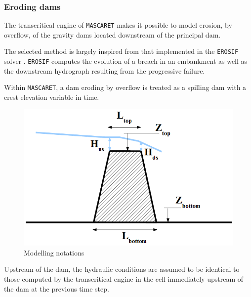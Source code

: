 \subsubsection{Eroding dams}

The transcritical engine of \texttt{MASCARET} makes it possible to model erosion, by overflow, of the gravity dams located downstream of the principal dam.

\vspace{0.5cm}

The selected method is largely inspired from that implemented in the \texttt{EROSIF} solver \cite{BENSLAMA95}. \texttt{EROSIF} computes the evolution of a breach in an embankment as well as the downstream hydrograph resulting from the progressive failure.

\vspace{0.5cm}

Within \texttt{MASCARET}, a dam eroding by overflow is treated as a spilling dam with a crest elevation variable in time.

\vspace{0.5cm}

\begin{figure}[h]
    \begin{center}
     \includegraphics[scale=1.2]{Figures/BarPds.eps}
     \caption{Modelling notations}
    \end{center}
\end{figure}

Upstream of the dam, the hydraulic conditions are assumed to be identical to those computed by the transcritical engine in the cell immediately upstream of the dam at the previous time step.

\vspace{0.5cm}

